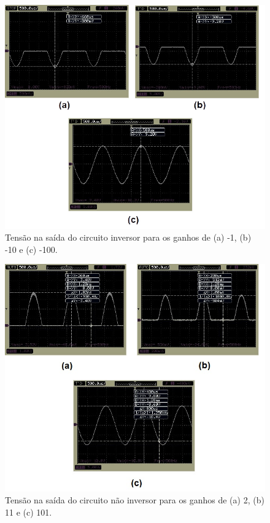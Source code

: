 \begin{figure}[H] 
\includegraphics[scale=0.8]{imagens/inv.jpg} 
\centering
\caption{Tensão na saída do circuito inversor para os ganhos de (a) -1, (b) -10 e (c) -100.}
\label{fig:inv} 
\end{figure} 

\begin{figure}[H] 
\includegraphics[scale=0.6]{imagens/ninv.jpg} 
\centering
\caption{Tensão na saída do circuito não inversor para os ganhos de (a) 2, (b) 11 e (c) 101.}
\label{fig:ninv} 
\end{figure} 


